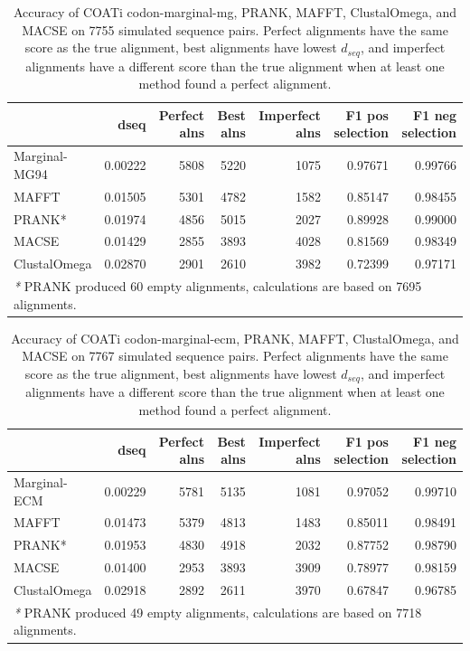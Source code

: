 \documentclass[
]{article}
\begin{document}
\begin{table}[H]

\caption{\label{tab:table-results-3}Accuracy of COATi codon-marginal-mg, PRANK, MAFFT, ClustalOmega, and MACSE on 7755 simulated sequence pairs. Perfect alignments have the same score as the true alignment, best alignments have lowest $d_{seq}$, and imperfect alignments have a different score than the true alignment when at least one method found a perfect alignment.}
\centering
\begin{tabular}[t]{l|r|r|r|r|r|r}
\hline
  & dseq & Perfect alns & Best alns & Imperfect alns & F1 pos selection & F1 neg selection\\
\hline
Marginal-MG94 & 0.00222 & 5808 & 5220 & 1075 & 0.97671 & 0.99766\\
\hline
MAFFT & 0.01505 & 5301 & 4782 & 1582 & 0.85147 & 0.98455\\
\hline
PRANK* & 0.01974 & 4856 & 5015 & 2027 & 0.89928 & 0.99000\\
\hline
MACSE & 0.01429 & 2855 & 3893 & 4028 & 0.81569 & 0.98349\\
\hline
ClustalOmega & 0.02870 & 2901 & 2610 & 3982 & 0.72399 & 0.97171\\
\hline
\multicolumn{7}{l}{\rule{0pt}{1em}\textit{*} PRANK produced 60 empty alignments, calculations are based on 7695 alignments.}\\
\end{tabular}
\end{table}
\begin{table}[H]

\caption{\label{tab:table-results-4}Accuracy of COATi codon-marginal-ecm, PRANK, MAFFT, ClustalOmega, and MACSE on 7767 simulated sequence pairs. Perfect alignments have the same score as the true alignment, best alignments have lowest $d_{seq}$, and imperfect alignments have a different score than the true alignment when at least one method found a perfect alignment.}
\centering
\begin{tabular}[t]{l|r|r|r|r|r|r}
\hline
  & dseq & Perfect alns & Best alns & Imperfect alns & F1 pos selection & F1 neg selection\\
\hline
Marginal-ECM & 0.00229 & 5781 & 5135 & 1081 & 0.97052 & 0.99710\\
\hline
MAFFT & 0.01473 & 5379 & 4813 & 1483 & 0.85011 & 0.98491\\
\hline
PRANK* & 0.01953 & 4830 & 4918 & 2032 & 0.87752 & 0.98790\\
\hline
MACSE & 0.01400 & 2953 & 3893 & 3909 & 0.78977 & 0.98159\\
\hline
ClustalOmega & 0.02918 & 2892 & 2611 & 3970 & 0.67847 & 0.96785\\
\hline
\multicolumn{7}{l}{\rule{0pt}{1em}\textit{*} PRANK produced 49 empty alignments, calculations are based on 7718 alignments.}\\
\end{tabular}
\end{table}
\end{document}
